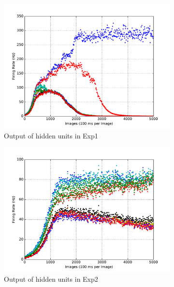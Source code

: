 \begin{figure}
\begin{subfigure}[t]{0.4\textwidth}
		\includegraphics[width=\textwidth]{pics_sdlm/15_exp_SRBM_teach_long/exp1_hid_s.pdf}
		\caption{Output of hidden units in Exp1}
	\end{subfigure}
	\begin{subfigure}[t]{0.4\textwidth}
		\includegraphics[width=\textwidth]{pics_sdlm/15_exp_SRBM_teach_long/exp2_hid_s.pdf}
		\caption{Output of hidden units in Exp2}
	\end{subfigure}\\
	\begin{subfigure}[t]{0.4\textwidth}

\end{subfigure}
\end{figure}
